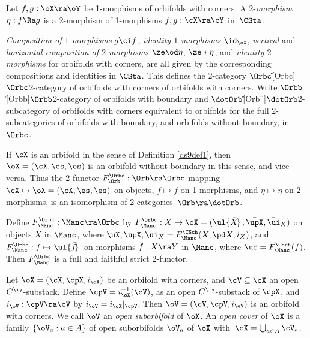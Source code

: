 \documentclass{article}
\begin{document}
\begin{dfn}
Let $f,g:\oX\ra\oY$ be 1-morphisms of orbifolds with corners. A
2-{\it morphism\/} $\eta:f\Ra g$ is a
2-morphism of 1-morphisms $f,g:\cX\ra\cY$ in~$\CSta$.

{\it Composition of\/ $1$-morphisms\/} $g\ci f$, {\it identity
$1$-morphisms\/} $\id_\oX$, {\it vertical\/} and {\it horizontal
composition of\/ $2$-morphisms\/} $\ze\od\eta$, $\ze*\eta$, and {\it
identity\/ $2$-morphisms\/} for orbifolds with corners, are all
given by the corresponding compositions and identities in $\CSta$.
This defines the 2-category $\Orbc$\G[Orbc]{$\Orbc$}{2-category of
orbifolds with corners} of orbifolds with corners.
Write $\Orbb$\G[Orbb]{$\Orbb$}{2-category of orbifolds with
boundary} and $\dotOrb$\G[Orb'']{$\dotOrb$}{2-subcategory of
orbifolds with corners equivalent to orbifolds} for the full
2-subcategories of orbifolds with boundary, and orbifolds without
boundary, in~$\Orbc$.

If $\cX$ is an orbifold in the sense of Definition \ref{ds9def1},
then $\oX=(\cX,\es,\es)$ is an orbifold without boundary in this
sense, and vice versa. Thus the 2-functor
$F_\Orb^\Orbc:\Orb\ra\Orbc$ mapping $\cX\mapsto\oX=(\cX,\es,\es)$ on
objects, $f\mapsto f$ on 1-morphisms, and $\eta\mapsto\eta$ on
2-morphisms, is an isomorphism of 2-categories~$\Orb\ra\dotOrb$.

Define $F_\Manc^\Orbc:\Manc\ra\Orbc$ by $F_\Manc^\Orbc:
X\mapsto\oX=(\ul{\bar X\!}\,,\bar\upX,\bar\ui_X)$ on objects $X$ in
$\Manc$, where $\uX,\upX,\ui_X=F_\Manc^\CSch(X,\pd X,i_X)$, and
$F_\Manc^\Orbc:f\mapsto\ul{\bar f\!}\,$ on morphisms $f:X\ra Y$ in
$\Manc$, where $\uf=F_\Manc^\CSch(f)$. Then $F_\Manc^\Orbc$ is a
full and faithful strict
2-functor.

Let $\oX=(\cX,\cpX,i_\oX)$ be an orbifold with corners, and
$\cV\subseteq\cX$ an open $C^\iy$-substack. Define
$\cpV=i_\oX^{-1}(\cV)$, as an open $C^\iy$-substack of $\cpX$, and
$i_\oV:\cpV\ra\cV$ by $i_\oV=i_\oX\vert_\cpV$. Then
$\oV=(\cV,\cpV,i_\eV)$ is an orbifold with corners. We call $\oV$ an
{\it open suborbifold\/}
of $\oX$. An {\it open cover\/}
of $\oX$ is a family $\{\oV_a:a\in A\}$ of open suborbifolds $\oV_a$
of $\oX$ with~$\cX=\bigcup_{a\in A}\cV_a$.
\label{ds12def1}
\end{dfn}
\end{document}
